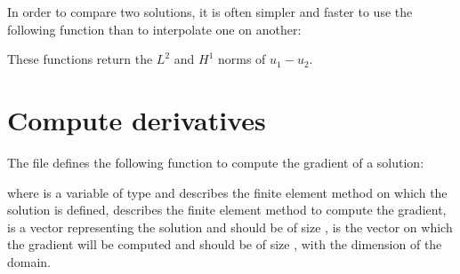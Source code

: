 \documentclass[a4paper,11pt,english]{sphinxmanual}
\begin{document}
In order to compare two solutions, it is often simpler and faster to use the
following function than to interpolate one  on another:

\begin{sphinxVerbatim}[commandchars=\\\{\}]
       
       
\end{sphinxVerbatim}

These functions return the \(L^2\) and \(H^1\) norms of \(u_1-u_2\).


\chapter{Compute derivatives}
\label{\detokenize{userdoc/computeD:compute-derivatives}}\label{\detokenize{userdoc/computeD:ud-computed}}\label{\detokenize{userdoc/computeD::doc}}
The file  defines the following function to
compute the gradient of a solution:

\begin{sphinxVerbatim}[commandchars=\\\{\}]
   
\end{sphinxVerbatim}

where  is a variable of type  and describes the finite element method
on which the solution is defined,  describes the finite element method to
compute the gradient,  is a vector representing the solution and should be
of size ,  is the vector on which the gradient will be
computed and should be of size , with  the dimension of
the domain.
\end{document}
